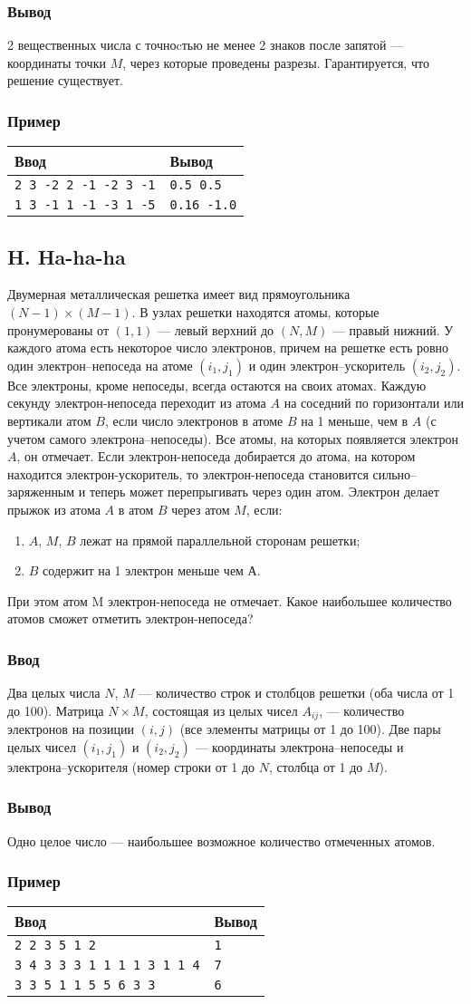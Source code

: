 \documentclass[10pt, a4paper]{article}
\newcommand{\informat}[1]
{
	\subsubsection*{Ввод} #1
}
\newcommand{\outformat}[1]
{
	\subsubsection*{Вывод} #1
}
\newcommand{\examplee}[4]
{
	\subsubsection*{Пример}
	\noindent
	\begin{center}
	\begin{tabularx}{\linewidth}{|X|X|}
	\hline
	Ввод 	& Вывод  	\\
	\hline
	{\tt #1} & {\tt #2}	\\
	\hline
	{\tt #3} & {\tt #4}	\\
	\hline
	\end{tabularx}
	\end{center}
}
\newcommand{\exampleee}[6]
{
	\subsubsection*{Пример}
	\noindent
	\begin{center}
	\begin{tabularx}{\linewidth}{|X|X|}
	\hline
	Ввод 	& Вывод  	\\
	\hline
	{\tt #1} & {\tt #2}	\\
	\hline
	{\tt #3} & {\tt #4}	\\
	\hline
	{\tt #5} & {\tt #6}	\\
	\hline
	\end{tabularx}
	\end{center}
}
\begin{document}
\outformat{2 вещественных числа с точноcтью не менее 2 знаков после запятой --- координаты точки $M$, через которые проведены разрезы. Гарантируется, что решение существует.}

\examplee{2 3 -2 2 -1 -2 3 -1}{0.5 0.5}{1 3 -1 1 -1 -3 1 -5}{0.16 -1.0}



\subsection*{H. Ha-ha-ha}

Двумерная металлическая решетка имеет вид прямоугольника $(N-1) \times (M-1)$. В узлах решетки находятся атомы, которые пронумерованы от $(1, 1)$ --- левый верхний до $(N, M)$ --- правый нижний. У каждого атома есть некоторое число электронов, причем на решетке есть ровно один электрон--непоседа на атоме $(i_1, j_1)$ и один электрон--ускоритель $(i_2, j_2)$. Все электроны, кроме непоседы, всегда остаются на своих атомах. Каждую секунду электрон-непоседа переходит из атома $A$ на соседний по горизонтали или вертикали атом $B$, если число электронов в атоме $B$ на 1 меньше, чем в $A$ (с учетом самого электрона--непоседы). Все атомы, на которых появляется электрон $A$, он отмечает. Если электрон-непоседа добирается до атома, на котором находится электрон-ускоритель, то электрон-непоседа становится сильно--заряженным и теперь может перепрыгивать через один атом. Электрон делает прыжок из атома $A$ в атом $B$ через атом $M$, если:
\begin{enumerate}
\item $A$, $M$, $B$ лежат на прямой параллельной сторонам решетки;
\item $B$ содержит на 1 электрон меньше чем А.
\end{enumerate}
При этом атом M электрон-непоседа не отмечает. Какое наибольшее количество атомов сможет отметить электрон-непоседа?

\informat{Два целых числа $N$, $M$ --- количество строк и столбцов решетки (оба числа от 1 до 100). Матрица $N \times M$, состоящая из целых чисел $A_{ij}$, --- количество электронов на позиции $(i, j)$ (все элементы матрицы от 1 до 100).
Две пары целых чисел $(i_1, j_1)$ и $(i_2, j_2)$ --- координаты электрона--непоседы и электрона--ускорителя (номер строки от 1 до $N$, столбца от 1 до $M$).}

\outformat{Одно целое число --- наибольшее возможное количество отмеченных атомов.}

\exampleee{2 2 \newline
4 3 \newline
4 5 \newline
2 1 \newline
2 2}{1}
{3 4 \newline 
3 3 3 3 \newline
3 1 1 1 \newline
4 1 3 1 \newline        
3 1 \newline
1 4}{7}
{3 3 \newline
5 5 1 \newline
5 1 5 \newline
1 5 6 \newline
3 3 \newline
3 3}{6}
\end{document}
